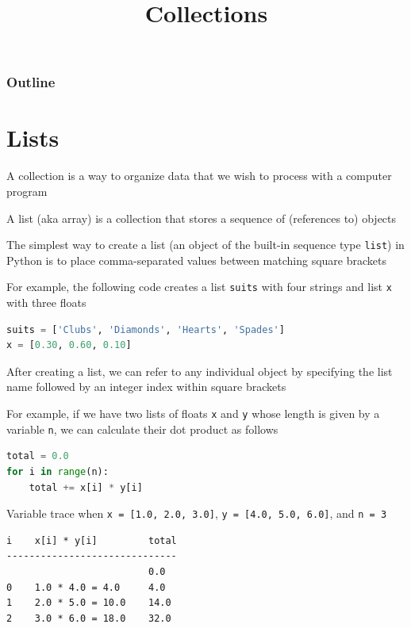 \documentclass[8pt,a4paper,compress]{beamer}
\title{Collections}
\date{}
\begin{document}
\begin{frame}
\vfill
\titlepage
\end{frame}

\begin{frame}
\frametitle{Outline}
\tableofcontents
\end{frame}

\section{Lists}
\begin{frame}[fragile]
\pause

A collection is a way to organize data that we wish to process with a computer program

\pause
\bigskip

A list (aka array) is a collection that stores a sequence of (references to) objects

\pause
\bigskip

The simplest way to create a list (an object of the built-in sequence type \lstinline{list}) in Python is to place comma-separated values between matching square brackets

\pause
\bigskip

For example, the following code creates a list \lstinline{suits} with four strings and list \lstinline{x} with three floats

\begin{lstlisting}[language=Python]
suits = ['Clubs', 'Diamonds', 'Hearts', 'Spades']
x = [0.30, 0.60, 0.10]
\end{lstlisting}

\pause
\bigskip

After creating a list, we can refer to any individual object by specifying the list name followed by an integer index within square brackets

\pause
\bigskip

For example, if we have two lists of floats \lstinline{x} and \lstinline{y} whose length is given by a variable \lstinline{n}, we can calculate their dot product as follows

\begin{lstlisting}[language=Python]
total = 0.0
for i in range(n):
    total += x[i] * y[i]
\end{lstlisting}

\pause

Variable trace when \lstinline{x = [1.0, 2.0, 3.0]}, \lstinline{y = [4.0, 5.0, 6.0]}, and \lstinline{n = 3}
\begin{lstlisting}[language={}]
i    x[i] * y[i]         total
------------------------------
                         0.0
0    1.0 * 4.0 = 4.0     4.0
1    2.0 * 5.0 = 10.0    14.0
2    3.0 * 6.0 = 18.0    32.0
\end{lstlisting} 
\end{frame}
\end{document}

